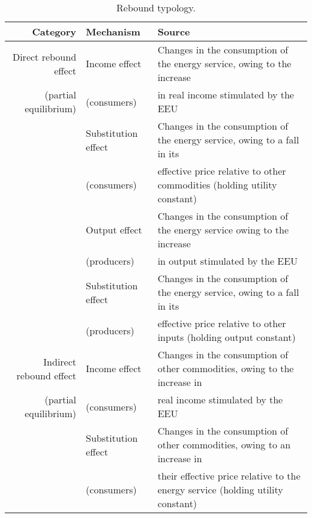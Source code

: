 
\begin{landscape}
\begin{table}
\footnotesize
\begin{center}
\caption{Rebound typology.}
\label{tab:rebound_typology}
\begin{tabular}{ r l l }
\toprule
Category & Mechanism & Source \\ 
\midrule
Direct rebound effect & Income effect       & Changes in the consumption of the energy service, owing to the increase \\
(partial equilibrium) & (consumers)         & in real income stimulated by the EEU \\
                      \cmidrule{2-3}
                      & Substitution effect & Changes in the consumption of the energy service, owing to a fall in its \\
                      & (consumers)         & effective price relative to other commodities (holding utility constant) \\
                      \cmidrule{2-3}
                      & Output effect       & Changes in the consumption of the energy service owing to the increase \\
                      & (producers)         & in output stimulated by the EEU \\
                      \cmidrule{2-3}
                      & Substitution effect & Changes in the consumption of the energy service, owing to a fall in its \\
                      & (producers)         & effective price relative to other inputs (holding output constant) \\
\midrule
Indirect rebound effect & Income effect     & Changes in the consumption of other commodities, owing to the increase in \\
(partial equilibrium)   & (consumers)       & real income stimulated by the EEU \\
                        \cmidrule{2-3}
                        & Substitution effect & Changes in the consumption of other commodities, owing to an increase in \\
                        & (consumers)         & their effective price relative to the energy service (holding utility constant) \\

\end{tabular}
\end{center}
\end{table}
\end{landscape}
